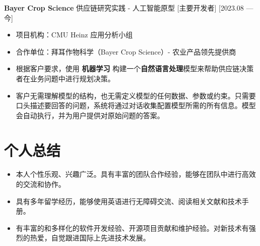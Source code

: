 \documentclass{resume}
\begin{document}
\ResumeItem[Bayer Crop Science]
{\textbf{Bayer Crop Science} 供应链研究实践 - 人工智能原型} %
[主要开发者]
[2023.08 — 今]

\begin{itemize}
  \item 项目机构：CMU Heinz 应用分析小组
  \item 合作单位：拜耳作物科学（Bayer Crop Science）- 农业产品领先提供商
  \item 根据客户要求，使用 \textbf{机器学习} 构建一个\textbf{自然语言处理}模型来帮助供应链决策者在业务问题中进行规划决策。
  \item 客户无需理解模型的结构，也无需定义模型的任何数据、参数或约束。只需要口头描述要回答的问题，系统将通过对话收集配置模型所需的所有信息。模型会自动执行，并为用户提供对原始问题的答案。
\end{itemize}

\section{个人总结}

\begin{itemize}
  \item 本人个性乐观、兴趣广泛。具有丰富的团队合作经验，能够在团队中进行高效的交流和协作。
  \item 具有多年留学经历，能够使用英语进行无障碍交流、阅读相关文献和技术手册。
  \item 有丰富的和多样化的软件开发经验、开源项目贡献和维护经验。对新技术有强烈的热爱，自觉跟进国际上先进技术发展。
\end{itemize}
\end{document}
